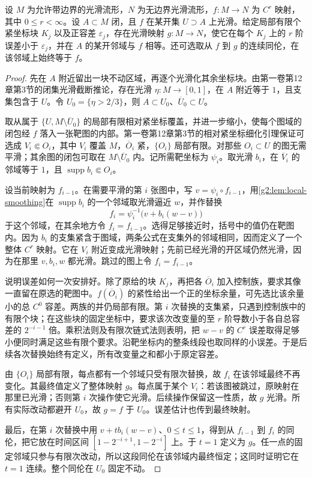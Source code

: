 \begin{theorem}[相对光滑逼近]
	\label{g2:thm:relative-smooth-approximation}
	设 \(M\) 为允许带边界的光滑流形，\(N\) 为无边界光滑流形，\(f:M\to N\) 为 \(C^r\) 映射，其中 \(0\le r<\infty\)。设 \(A\subset M\) 闭，且 \(f\) 在某开集 \(U\supset A\) 上光滑。给定局部有限个紧坐标块 \(K_j\) 以及正容差 \(\varepsilon_j\)，存在光滑映射 \(g:M\to N\)，使它在每个 \(K_j\) 上的 \(r\) 阶误差小于 \(\varepsilon_j\)，并在 \(A\) 的某开邻域与 \(f\) 相等。还可选取从 \(f\) 到 \(g\) 的连续同伦，在该邻域上始终等于 \(f\)。
\end{theorem}
\begin{proof}
	先在 \(A\) 附近留出一块不动区域，再逐个光滑化其余坐标块。由第一卷第12章第3节的闭集光滑截断推论，存在光滑 \(\eta:M\to[0,1]\)，在 \(A\) 附近等于 \(1\)，且支集包含于 \(U\)。令 \(U_0=\{\eta>2/3\}\)，则 \(A\subset U_0\)、\(\overline U_0\subset U\)。

	取从属于 \(\{U,M\setminus\overline U_0\}\) 的局部有限相对紧坐标覆盖，并进一步缩小，使每个图域的闭包经 \(f\) 落入一张靶图的内部。第一卷第12章第3节的相对紧坐标细化引理保证可选成 \(V_i\Subset O_i\)，其中 \(V_i\) 覆盖 \(M\)，\(\overline O_i\) 紧，\(\{O_i\}\) 局部有限。对那些 \(O_i\subset U\) 的图无需平滑；其余图的闭包可取在 \(M\setminus\overline U_0\) 内。记所需靶坐标为 \(\psi_i\)。取光滑 \(b_i\)，在 \(\overline V_i\) 的邻域等于 \(1\)，且 \(\operatorname{supp}b_i\Subset O_i\)。

	设当前映射为 \(f_{i-1}\)。在需要平滑的第 \(i\) 张图中，写 \(v=\psi_i\circ f_{i-1}\)，用\cref{g2:lem:local-smoothing}在 \(\operatorname{supp}b_i\) 的一个邻域取光滑逼近 \(w\)，并作替换
	\[
		f_i=\psi_i^{-1}\bigl(v+b_i(w-v)\bigr)
	\]
	于这个邻域，在其余地方令 \(f_i=f_{i-1}\)。选得足够接近时，括号中的值仍在靶图内。因为 \(b_i\) 的支集紧含于图域，两条公式在支集外的邻域相同，因而定义了一个整体 \(C^r\) 映射。它在 \(V_i\) 附近变成光滑映射；先前已经光滑的开区域仍然光滑，因为在那里 \(v,b_i,w\) 都光滑。跳过的图上令 \(f_i=f_{i-1}\)。

	说明误差如何一次安排好。除了原给的块 \(K_j\)，再把各 \(\overline O_i\) 加入控制族，要求其像一直留在原选的靶图中。\(f(\overline O_i)\) 的紧性给出一个正的坐标余量，可先选比该余量小的总 \(C^0\) 容差。两族的并仍局部有限。第 \(i\) 次替换的支集紧，只遇到控制族中的有限个块；在这些块的固定坐标中，要求该次改变量的至 \(r\) 阶导数小于各自总容差的 \(2^{-i-1}\) 倍。乘积法则及有限次链式法则表明，把 \(w-v\) 的 \(C^r\) 误差取得足够小便同时满足这些有限个要求。沿靶坐标内的整条线段也取同样的小误差。于是后续各次替换始终有定义，所有改变量之和都小于原定容差。

	由 \(\{O_i\}\) 局部有限，每点都有一个邻域只受有限次替换，故 \(f_i\) 在该邻域最终不再变化。其最终值定义了整体映射 \(g\)。每点属于某个 \(V_i\)：若该图被跳过，原映射在那里已光滑；否则第 \(i\) 次操作使它光滑。后续操作保留这一性质，故 \(g\) 光滑。所有实际改动都避开 \(U_0\)，故 \(g=f\) 于 \(U_0\)。误差估计也传到最终映射。

	最后，在第 \(i\) 次替换中用 \(v+t b_i(w-v)\)、\(0\le t\le1\)，得到从 \(f_{i-1}\) 到 \(f_i\) 的同伦，把它放在时间区间 \([1-2^{-i+1},1-2^{-i}]\) 上。于 \(t=1\) 定义为 \(g\)。任一点的固定邻域只参与有限次改动，所以这段同伦在该邻域内最终恒定；这同时证明它在 \(t=1\) 连续。整个同伦在 \(U_0\) 固定不动。
\end{proof}

